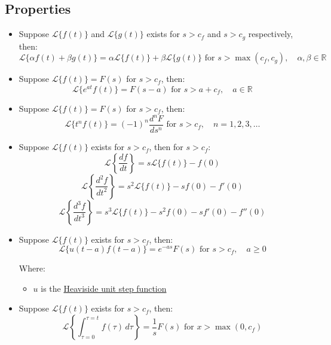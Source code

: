\documentclass[11pt]{article}
\begin{document}
 \newpage

\subsection{Properties}
\label{sec:org8825b0b}
\begin{itemize}
\item Suppose \(\mathcal{L} \{ f(t) \}\) and \(\mathcal{L} \{ g(t) \}\) exists for \(s > c_f\) and \(s > c_g\) respectively, then:
\[\mathcal{L} \{ \alpha f(t) + \beta g(t) \} = \alpha \mathcal{L} \{ f(t) \} + \beta \mathcal{L} \{ g(t) \} \text{ for } s > \max (c_f, c_g), \quad \alpha, \beta \in \mathbb{R}\]

\item Suppose \(\mathcal{L} \{ f(t) \} = F(s)\) for \(s > c_f\), then:
\[\mathcal{L} \{ e^{at} f(t) \} = F(s - a) \text{ for } s > a + c_f, \quad a \in \mathbb{R}\]

\item Suppose \(\mathcal{L} \{ f(t) \} = F(s)\) for \(s > c_f\), then:
\[\mathcal{L} \{ t^n f(t) \} = (-1)^n \frac{d^n F}{ds^n} \text{ for } s > c_f, \quad n = 1, 2, 3, \ldots\]

\item Suppose \(\mathcal{L} \{ f(t) \}\) exists for \(s > c_f\), then for \(s > c_f\):
\[\mathcal{L} \left\{ \frac{df}{dt} \right\} = s \mathcal{L} \{ f(t) \} - f(0)\]
\[\mathcal{L} \left\{ \frac{d^2 f}{dt^2} \right\} = s^2 \mathcal{L} \{ f(t) \} - sf(0) - f'(0)\]
\[\mathcal{L} \left\{ \frac{d^3 f}{dt^3} \right\} = s^3 \mathcal{L} \{ f(t) \} - s^2f(0) - sf'(0) - f''(0)\]

\item Suppose \(\mathcal{L} \{ f(t) \}\) exists for \(s > c_f\), then:
\[\mathcal{L} \{ u(t - a) f(t - a) \} = e^{-as} F(s) \text{ for } s > c_f, \quad a \ge 0\]

Where:
\begin{itemize}
\item \(u\) is the \hyperref[org347bf95]{Heaviside unit step function}
\end{itemize}

\item Suppose \(\mathcal{L} \{ f(t) \}\) exists for \(s > c_f\), then:
\[\mathcal{L} \left\{ \int_{\tau = 0}^{\tau = t} f(\tau) \, d \tau \right\} = \frac{1}{s} F(s) \text{ for } x > \max (0, c_f)\]
\end{itemize}
\end{document}
